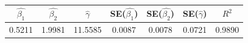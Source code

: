 \begin{tabular}{ccccccc}
\toprule
$\hat{\beta_1}$ & $\hat{\beta_2}$ & $\hat{\gamma}$ & SE($\hat{\beta_1}$) & SE($\hat{\beta_2}$) & SE($\hat{\gamma}$) & $R^2$ \\
\midrule
0.5211 & 1.9981 & 11.5585 & 0.0087 & 0.0078 & 0.0721 & 0.9890 \\
\bottomrule
\end{tabular}